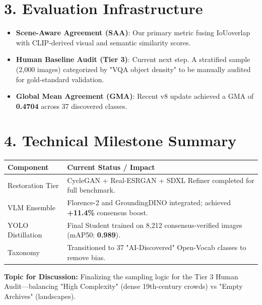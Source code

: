 \documentclass[11pt,a4paper]{article}
\begin{document}
\section*{3. Evaluation Infrastructure}
\begin{itemize}[noitemsep]
    \item \textbf{Scene-Aware Agreement (SAA)}: Our primary metric fusing IoUoverlap with CLIP-derived visual and semantic similarity scores.
    \item \textbf{Human Baseline Audit (Tier 3)}: Current next step. A stratified sample (2,000 images) categorized by "VQA object density" to be manually audited for gold-standard validation.
    \item \textbf{Global Mean Agreement (GMA)}: Recent v8 update achieved a GMA of \textbf{0.4704} across 37 discovered classes.
\end{itemize}

\section*{4. Technical Milestone Summary}
\begin{table}[h!]
\centering
\small
\begin{tabular}{lp{10cm}}
\toprule
\textbf{Component} & \textbf{Current Status / Impact} \\
\midrule
Restoration Tier & CycleGAN + Real-ESRGAN + SDXL Refiner completed for full benchmark. \\
VLM Ensemble & Florence-2 and GroundingDINO integrated; achieved \textbf{+11.4\%} consensus boost. \\
YOLO Distillation & Final Student trained on 8,212 consensus-verified images (mAP50: \textbf{0.989}). \\
Taxonomy & Transitioned to 37 "AI-Discovered" Open-Vocab classes to remove bias. \\
\bottomrule
\end{tabular}
\end{table}

\vspace{0.3cm}
\noindent \textbf{Topic for Discussion:} Finalizing the sampling logic for the Tier 3 Human Audit—balancing "High Complexity" (dense 19th-century crowds) vs "Empty Archives" (landscapes).
\end{document}
